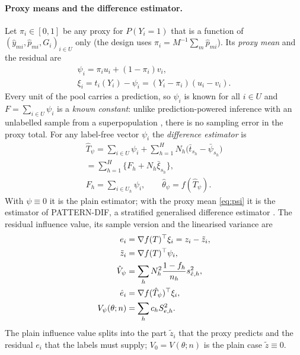 \documentclass[pdflatex,sn-mathphys-num,iicol]{sn-jnl}
\theoremstyle{thmstyleone}
\theoremstyle{thmstyletwo}
\theoremstyle{thmstylethree}
\begin{document}
\paragraph{Proxy means and the difference estimator.} Let $\pi_i\in[0,1]$ be any proxy for $P(Y_i=1)$
that is a function of $(\hat y_{mi},\hat p_{mi},G_i)_{i\in U}$ only (the design uses
$\pi_i=M^{-1}\sum_m\hat p_{mi}$). Its \emph{proxy mean} and the residual are
\begin{equation}\label{eq:psi}
\begin{gathered}
\psi_i=\pi_iu_i+(1-\pi_i)v_i,\\
\xi_i=t_i(Y_i)-\psi_i=(Y_i-\pi_i)(u_i-v_i).
\end{gathered}
\end{equation}
Every unit of the pool carries a prediction, so $\psi_i$ is known for all $i\in U$ and $F=\sum_{i\in U}\psi_i$ is a
\emph{known constant}: unlike prediction-powered inference with an unlabelled sample from a superpopulation
\citep{angelopoulos2023ppi,angelopoulos2026ppipp}, there is no sampling error in the proxy total. For any label-free
vector $\psi_i$ the \emph{difference estimator} is
\begin{equation}\label{eq:dif}
\begin{gathered}
\hat T_\psi=\sum_{i\in U}\psi_i+\sum_{h=1}^HN_h\big(\bar t_{s_h}-\bar\psi_{s_h}\big)\\
=\sum_{h=1}^H\big\{F_h+N_h\bar\xi_{s_h}\big\},\\
F_h=\sum_{i\in U_h}\psi_i,\qquad
\hat\theta_\psi=f(\hat T_\psi).
\end{gathered}
\end{equation}
With $\psi\equiv0$ it is the plain estimator; with the proxy mean \eqref{eq:psi} it is the estimator of PATTERN-DIF, a
stratified generalised difference estimator \citep{cassel1976,sarndal1992}. The residual influence value, its
sample version and the linearised variance are
\begin{align}
e_i&=\nabla f(T)^{\top}\xi_i=z_i-\tilde z_i,\notag\\
\tilde z_i&=\nabla f(T)^{\top}\psi_i,\notag\\
\hat V_\psi&=\sum_hN_h^2\frac{1-f_h}{n_h}s^2_{\hat e,h},\notag\\
\hat e_i&=\nabla f(\hat T_\psi)^{\top}\xi_i,\notag\\
V_\psi(\theta;n)&=\sum_hc_hS^2_{e,h}.\label{eq:resid}
\end{align}
The plain influence value splits into the part $\tilde z_i$ that the proxy predicts and the residual $e_i$ that
the labels must supply; $V_0=V(\theta;n)$ is the plain case $\tilde z\equiv0$.
\end{document}
